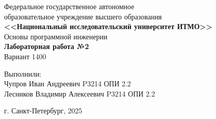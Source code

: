 \begin{titlepage}
    \centering
    Федеральное государственное автономное \\
    образовательное учреждение высшего образования \\
    \textbf{<<Национальный исследовательский университет ИТМО>>} \\

    \vfill
    Основы программной инженерии \\
    \vspace{0.5\baselineskip}
    \textbf{Лабораторная работа №2} \\
    \vspace{0.5\baselineskip}
    Вариант 1400 \\

    \vfill

    \flushright
    Выполнили:\\
    Чупров Иван Андреевич P3214 ОПИ 2.2\\
    Лесников Владимир Алексеевич P3214 ОПИ 2.2\\

    \vspace{4\baselineskip}

    \centering
    г. Санкт-Петербург, 2025

\end{titlepage}
